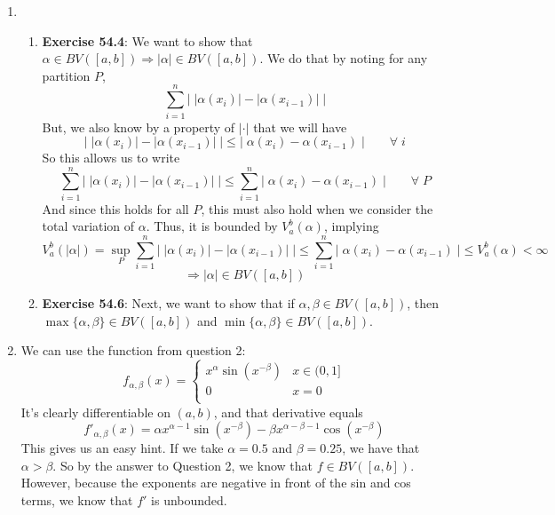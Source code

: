\documentclass[12pt]{article}
\theoremstyle{plain}
\theoremstyle{definition}
\theoremstyle{remark}
\begin{document}
\begin{enumerate}
\item 
\begin{enumerate} 
\item \textbf{Exercise 54.4}: We want to show that $\alpha\in BV([a,b]) \Rightarrow |\alpha|\in BV([a,b])$. We do that by noting for any partition $P$, 
\[ 
    \sum^n_{i=1} \left\lvert \;|\alpha(x_{i})| - |\alpha(x_{i-1})|
    \;\right\rvert 
\]
But, we also know by a property of $|\cdot|$ that we will have
\[ 
    \left\lvert \;|\alpha(x_{i})| - |\alpha(x_{i-1})|\;
    \right\rvert \leq 
    \left\lvert \;\alpha(x_{i}) - \alpha(x_{i-1})\;
    \right\rvert  \qquad \forall\; i
\]
So this allows us to write
\[ 
    \sum^n_{i=1} \left\lvert \;|\alpha(x_{i})| - |\alpha(x_{i-1})|
    \;\right\rvert 
    \leq 
    \sum^n_{i=1} 
    \left\lvert \;\alpha(x_{i}) - \alpha(x_{i-1})\;
    \right\rvert  \qquad \forall \; P
\]
And since this holds for all $P$, this must also hold when we consider the total variation of $\alpha$.  Thus, it is bounded by $V_a^b(\alpha)$, implying
\[ 
    V_a^b(|\alpha|) = \sup_P
    \sum^n_{i=1} \left\lvert \;|\alpha(x_{i})| - |\alpha(x_{i-1})|
    \;\right\rvert 
    \leq 
    \sum^n_{i=1} 
    \left\lvert \;\alpha(x_{i}) - \alpha(x_{i-1})\;
    \right\rvert \leq V_a^b(\alpha) < \infty
\]
\[ 
    \Rightarrow |\alpha|\in BV([a,b])
\]

\item 
    \textbf{Exercise 54.6}: Next, we want to show that if $\alpha, \beta \in BV([a,b])$, then $\max\{\alpha, \beta\} \in BV([a,b])$ and $\min\{\alpha, \beta\} \in BV([a,b])$.

\end{enumerate} 

\item We can use the function from question 2:
    \[ 
        f_{\alpha, \beta}(x) = 
        \begin{cases}
            x^\alpha \sin(x^{-\beta}) & x\in (0, 1] \\
            0 & x=0 \\
        \end{cases}
    \]
It's clearly differentiable on $(a,b)$, and that derivative equals
\begin{equation}
        {f'}_{\alpha, \beta}(x) = \alpha x^{\alpha-1} 
            \sin(x^{-\beta}) - \beta x^{\alpha-\beta-1} \cos(x^{-\beta})
\end{equation}
This gives us an easy hint.  If we take $\alpha = 0.5$ and $\beta=0.25$, we have that $\alpha>\beta$.  So by the answer to Question 2, we know that $f\in BV([a,b])$. However, because the exponents are negative in front of the sin and cos terms, we know that $f'$ is unbounded. 
    


\end{enumerate}
\end{document}
